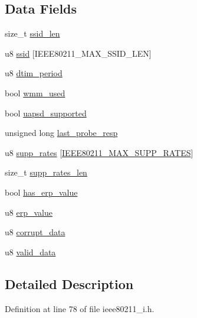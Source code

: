 \subsection*{Data Fields}
\begin{DoxyCompactItemize}
\item 
size\-\_\-t \hyperlink{structieee80211__bss_aa33b1cb67d6867fb505f832d761810a7}{ssid\-\_\-len}
\item 
u8 \hyperlink{structieee80211__bss_ae8d768cff77168f424870b6745c90714}{ssid} \mbox{[}I\-E\-E\-E80211\-\_\-\-M\-A\-X\-\_\-\-S\-S\-I\-D\-\_\-\-L\-E\-N\mbox{]}
\item 
u8 \hyperlink{structieee80211__bss_af039d096de0e0339234f5dd273cac9cb}{dtim\-\_\-period}
\item 
bool \hyperlink{structieee80211__bss_aebf73ffff3e743095dbc5613cf287640}{wmm\-\_\-used}
\item 
bool \hyperlink{structieee80211__bss_a4dff539e426e32e9bb2253d826f04529}{uapsd\-\_\-supported}
\item 
unsigned long \hyperlink{structieee80211__bss_ac009e6154e131af1edf18c445ebb4393}{last\-\_\-probe\-\_\-resp}
\item 
u8 \hyperlink{structieee80211__bss_a84e8f110c38462141993f5eccc9a2e70}{supp\-\_\-rates} \mbox{[}\hyperlink{ieee80211__i_8h_a486b5218ba1e2448c5c3b43470cdd58c}{I\-E\-E\-E80211\-\_\-\-M\-A\-X\-\_\-\-S\-U\-P\-P\-\_\-\-R\-A\-T\-E\-S}\mbox{]}
\item 
size\-\_\-t \hyperlink{structieee80211__bss_aa6efda8d2063cb2f8ef7e00b43b1954d}{supp\-\_\-rates\-\_\-len}
\item 
bool \hyperlink{structieee80211__bss_a99d04a59fd3ef9124414f0c8b3a49f12}{has\-\_\-erp\-\_\-value}
\item 
u8 \hyperlink{structieee80211__bss_aa6fc4ecdee2d9c7a81031f23f77e8f6f}{erp\-\_\-value}
\item 
u8 \hyperlink{structieee80211__bss_ae66fd8cebf5dbe25a9e67d233f7fb8a1}{corrupt\-\_\-data}
\item 
u8 \hyperlink{structieee80211__bss_acaa86d140b076b0a86f9476ec8653c1f}{valid\-\_\-data}
\end{DoxyCompactItemize}


\subsection{Detailed Description}


Definition at line 78 of file ieee80211\-\_\-i.\-h.



